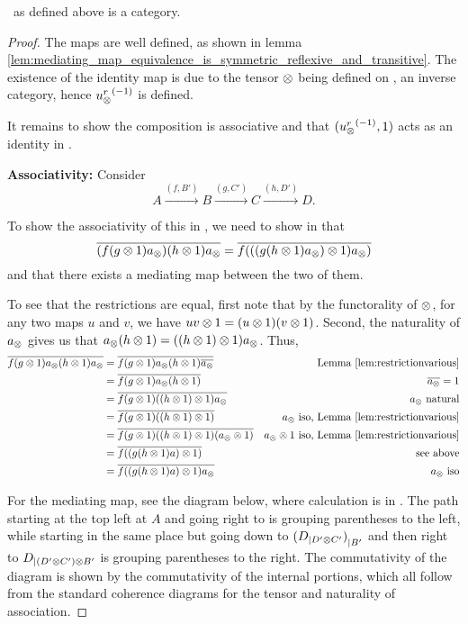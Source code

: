 \begin{lemma}\label{lem:xt_is_a_category}
  \Xt\ as defined above is a category.
\end{lemma}
\begin{proof}
  The maps are well defined, as shown in lemma
  \vref{lem:mediating_map_equivalence_is_symmetric_reflexive_and_transitive}. The existence of the
  identity map is due to the tensor $\otimes$ being defined on \X, an inverse category, hence
  ${u_{\otimes}^r}^{(-1)}$ is defined.

  It remains to show the composition is associative and that $({u_{\otimes}^r}^{(-1)}, 1)$ acts as an identity
  in \Xt.

  \textbf{Associativity:}
  Consider
  \[
    A\xrightarrow{(f,B')}B\xrightarrow{(g,C')} C \xrightarrow{(h,D')}D.
  \]

  To show the associativity of this in \Xt, we need to show in \X that
  \[
    \overline{(f(g\otimes1)a_{\otimes}) (h\otimes1)a_{\otimes}} = \overline{f (((g(h\otimes1)a_{\otimes})\otimes1) a_{\otimes})}
  \]
  and that there exists a mediating map between the two of them.

  To see that the restrictions are equal, first note that by the functorality of $\otimes$, for any two
  maps $u$ and $v$, we have $u v \otimes 1 = (u\otimes1) (v\otimes1)$. Second, the naturality of $a_{\otimes}$ gives us
  that $a_{\otimes} (h \otimes 1) = ((h\otimes1)\otimes1) a_{\otimes}$. Thus,
  \begin{align*}
    \overline{f(g\otimes1)a_{\otimes} (h\otimes1)a_{\otimes}}
      & = \overline{f(g\otimes1)a_{\otimes} (h\otimes1)\overline{a_{\otimes}}}
    & \text{Lemma \ref{lem:restrictionvarious}} \\
    & = \overline{f(g\otimes1)a_{\otimes} (h\otimes1)} & \overline{a_{\otimes}}=1 \\
    & = \overline{f(g\otimes1) ((h\otimes1)\otimes1) a_{\otimes} } & a_{\otimes}\text{ natural} \\
    & = \overline{f(g\otimes1) ((h\otimes1)\otimes1) }
      & a_{\otimes}   \text{ iso, Lemma \ref{lem:restrictionvarious}}\\
    & = \overline{f(g\otimes1) ((h\otimes1)\otimes1) (a_{\otimes}\otimes1)}
      & a_{\otimes}\otimes1 \text{ iso, Lemma \ref{lem:restrictionvarious}}\\
    & = \overline{f((g (h\otimes1)a )\otimes1)} & \text{ see above}\\
    & = \overline{f((g (h\otimes1)a )\otimes1)a_{\otimes}} & a_{\otimes}   \text{ iso}
  \end{align*}

  For the mediating map, see the diagram below, where calculation is in \X. The path starting at
  the top left at $A$ and going right to  is grouping parentheses to the
  left, while starting in the same place but going down to ${({D}_{|{D' \otimes C'}})}_{|{B'}}$ and
  then right to $ {D}_{|{(D' \otimes C') \otimes B'}}$ is grouping parentheses to the right. The
  commutativity of the diagram is shown by the commutativity of the internal portions, which all
  follow from the standard coherence diagrams for the tensor and naturality of association.


\end{proof}
